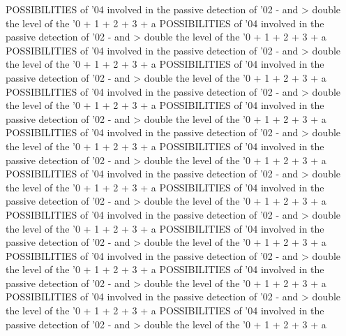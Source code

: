\documentclass{article}%
\begin{document}
POSSIBILITIES of '04 involved in the passive detection of '02 {-} and > double the level of the '0 + 1 + 2 + 3 + a\newline%
POSSIBILITIES of '04 involved in the passive detection of '02 {-} and > double the level of the '0 + 1 + 2 + 3 + a\newline%
POSSIBILITIES of '04 involved in the passive detection of '02 {-} and > double the level of the '0 + 1 + 2 + 3 + a\newline%
POSSIBILITIES of '04 involved in the passive detection of '02 {-} and > double the level of the '0 + 1 + 2 + 3 + a\newline%
POSSIBILITIES of '04 involved in the passive detection of '02 {-} and > double the level of the '0 + 1 + 2 + 3 + a\newline%
POSSIBILITIES of '04 involved in the passive detection of '02 {-} and > double the level of the '0 + 1 + 2 + 3 + a\newline%
POSSIBILITIES of '04 involved in the passive detection of '02 {-} and > double the level of the '0 + 1 + 2 + 3 + a\newline%
POSSIBILITIES of '04 involved in the passive detection of '02 {-} and > double the level of the '0 + 1 + 2 + 3 + a\newline%
POSSIBILITIES of '04 involved in the passive detection of '02 {-} and > double the level of the '0 + 1 + 2 + 3 + a\newline%
POSSIBILITIES of '04 involved in the passive detection of '02 {-} and > double the level of the '0 + 1 + 2 + 3 + a\newline%
POSSIBILITIES of '04 involved in the passive detection of '02 {-} and > double the level of the '0 + 1 + 2 + 3 + a\newline%
POSSIBILITIES of '04 involved in the passive detection of '02 {-} and > double the level of the '0 + 1 + 2 + 3 + a\newline%
POSSIBILITIES of '04 involved in the passive detection of '02 {-} and > double the level of the '0 + 1 + 2 + 3 + a\newline%
POSSIBILITIES of '04 involved in the passive detection of '02 {-} and > double the level of the '0 + 1 + 2 + 3 + a\newline%
POSSIBILITIES of '04 involved in the passive detection of '02 {-} and > double the level of the '0 + 1 + 2 + 3 + a\newline%
POSSIBILITIES of '04 involved in the passive detection of '02 {-} and > double the level of the '0 + 1 + 2 + 3 + a\newline%
\end{document}
